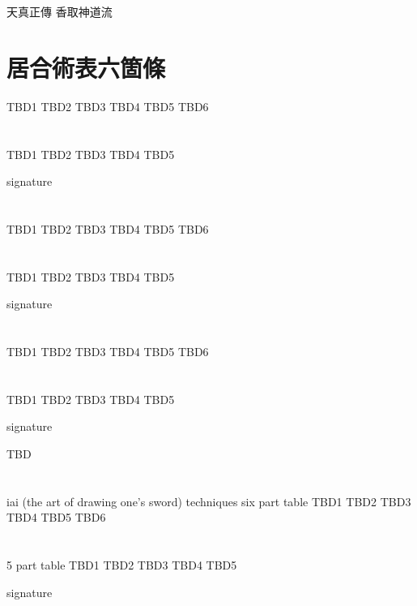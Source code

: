\documentclass[dvipdfmx, a4paper, 12pt]{utarticle}
\begin{document}
\begin{CJK*}{UTF8}{min}
\CJKtilde
\begin{landscape}

\newpage
\pagestyle{empty}
天真正傳
香取神道流
\section{居合術表六箇條}
TBD1
TBD2
TBD3
TBD4
TBD5
TBD6
\section{}
TBD1
TBD2
TBD3
TBD4
TBD5

signature

\newpage
\pagestyle{empty}
\section{}
TBD1
TBD2
TBD3
TBD4
TBD5
TBD6
\section{}
TBD1
TBD2
TBD3
TBD4
TBD5

signature

\newpage
\pagestyle{empty}
\section{}
TBD1
TBD2
TBD3
TBD4
TBD5
TBD6
\section{}
TBD1
TBD2
TBD3
TBD4
TBD5

signature

\newpage
\pagestyle{empty}
TBD
\section{}
iai (the art of drawing one's sword) techniques six part table
TBD1
TBD2
TBD3
TBD4
TBD5
TBD6
\section{}
5 part table
TBD1
TBD2
TBD3
TBD4
TBD5

signature

\end{landscape}
\end{CJK*}
\end{document}
